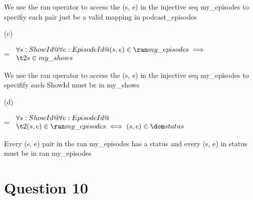 \documentclass[a4paper,10pt,fleqn]{article}
\begin{document}
\bigskip


\bigskip

\setlength{\leftskip}{\dimexpr\parindent+2em\relax}
\noindent We use the ran operator to access the (s, e) in the injective seq my\_episodes to specifiy each pair just be a valid mapping in podcast\_episodes

\bigskip

\setlength{\leftskip}{0pt}
\medskip

\noindent\hspace*{\parindent}(c)

\setlength{\leftskip}{\dimexpr\parindent+2em\relax}
\savedleftskip=\leftskip
\noindent
$\displaystyle
\begin{array}{l}
\forall s : ShowId @ \forall e : EpisodeId @ (s, e) \in \ran my\_episodes \implies \\
\t2 s \in my\_shows
\end{array}$

\bigskip


\bigskip

\setlength{\leftskip}{\dimexpr\parindent+2em\relax}
\noindent We use the ran operator to access the (s, e) in the injective seq my\_episodes to specifify each ShowId must be in my\_shows

\bigskip

\setlength{\leftskip}{0pt}
\medskip

\noindent\hspace*{\parindent}(d)

\setlength{\leftskip}{\dimexpr\parindent+2em\relax}
\savedleftskip=\leftskip
\noindent
$\displaystyle
\begin{array}{l}
\forall s : ShowId @ \forall e : EpisodeId @ \\
\t2 (s, e) \in \ran my\_episodes \iff (s, e) \in \dom status
\end{array}$

\bigskip


\bigskip

\setlength{\leftskip}{\dimexpr\parindent+2em\relax}
\noindent Every (s, e) pair in the ran my\_episodes has a status and every (s, e) in status must be in ran my\_episodes

\bigskip

\setlength{\leftskip}{0pt}
\section*{Question 10}
\end{document}
